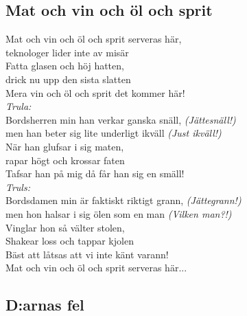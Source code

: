 \newpage
\subsection*{Mat och vin och öl och sprit} 

\noindent Mat och vin och öl och sprit serveras här,\\
\noindent teknologer lider inte av misär\\
\noindent Fatta glasen och höj hatten,\\
\noindent drick nu upp den sista slatten\\
\noindent Mera vin och öl och sprit det kommer här!\\

\noindent \textit{Trula:}\\
\noindent Bordsherren min han verkar ganska snäll, \textit{(Jättesnäll!)}\\
\noindent men han beter sig lite underligt ikväll \textit{(Just ikväll!)}\\
\noindent När han glufsar i sig maten,\\
\noindent rapar högt och krossar faten\\
\noindent Tafsar han på mig då får han sig en smäll!\\

\noindent \textit{Truls:}\\
\noindent Bordsdamen min är faktiskt riktigt grann, \textit{(Jättegrann!)}\\
\noindent men hon halsar i sig ölen som en man \textit{(Vilken man?!)}\\
\noindent Vinglar hon så välter stolen,\\
\noindent Shakear loss och tappar kjolen\\
\noindent Bäst att låtsas att vi inte känt varann!\\

\noindent Mat och vin och öl och sprit serveras här...\\


\newpage


\subsection*{D:arnas fel} 

